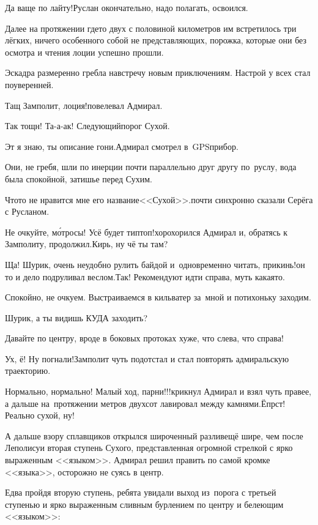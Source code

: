 \diagdash Да ваще по лайту!\mdash Руслан окончательно, надо полагать, освоился.

Далее на протяжении где\sdash то двух с половиной километров им встретилось три лёгких, ничего особенного собой не представляющих, порожка, которые они без осмотра и чтения лоции успешно прошли.

Эскадра размеренно гребла навстречу новым приключениям. Настрой у всех стал поуверенней.

\diagdash Тащ Замполит, лоция!\mdash повелевал Адмирал.

\diagdash Так тощн! Та-а-ак! Следующий\mdash порог Сухой.

\diagdash Эт я знаю, ты описание гони.\mdash Адмирал смотрел в~GPS\sdash прибор.

Они, не гребя, шли по инерции почти параллельно друг другу по~руслу, вода была спокойной, затишье перед Сухим.

\diagdash Что\sdash то не нравится мне его название\mdash <<Сухой>>.\mdash почти синхронно сказали Серёга с Русланом.

\diagdash Не очкуйте, м\'{о}тросы! Усё будет тип\sdash топ!\mdash хорохорился Адмирал и, обратясь к Замполиту, продолжил.\mdash Кирь, ну чё ты там?

\diagdash Ща! Шурик, очень неудобно рулить байдой и~одновременно читать, прикинь!\mdash он то и дело подруливал веслом.\mdash Так! Рекомендуют идти справа, муть какая\sdash то.

\diagdash Спокойно, не очкуем. Выстраиваемся в кильватер за~мной и потихоньку заходим. 

\diagdash Шурик, а ты видишь КУДА заходить?

\diagdash Давайте по центру, вроде в боковых протоках хуже, что слева, что справа!

\diagdash Ух, ё! Ну погнали!\mdash Замполит чуть подотстал и стал повторять адмиральскую траекторию.

\diagdash Нормально, нормально! Малый ход, парни!!!\mdash крикнул Адмирал и взял чуть правее, а дальше на~протяжении метров двухсот лавировал между камнями.\mdash Ёпрст! Реально сухой, ну!

А дальше взору сплавщиков открылся широченный разлив\mdash ещё шире, чем после Леполису\mdash и вторая ступень Сухого, представленная огромной стрелкой с ярко выраженным <<языком>>. Адмирал решил править по самой кромке <<языка>>, осторожно не суясь в центр.

Едва пройдя вторую ступень, ребята увидали выход из~порога с третьей ступенью и ярко выраженным сливным бурлением по центру и белеющим <<языком>>:

